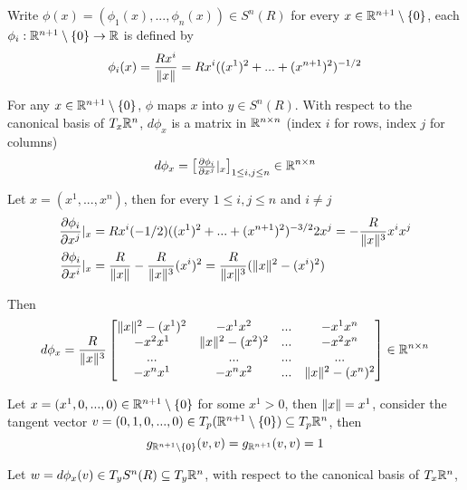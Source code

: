 Write $\phi(x) = (\phi_1(x), ..., \phi_n(x)) \in S^n(R)$ for every $x \in \mathbb{R}^{n+1} \setminus \{0\}$, each $\phi_i: \mathbb{R}^{n+1} \setminus \{0\} \to \mathbb{R}$ is defined by
$$
	\phi_i(x) = \frac{ R x^i}{\lVert x\rVert} = R x^i ((x^1)^2 + ... + (x^{n+1})^2)^{- 1/2}
$$

For any $x \in \mathbb{R}^{n+1} \setminus \{0\}$, $\phi$ maps $x$ into $y \in S^n(R)$. With respect to the canonical basis of $T_x \mathbb{R}^n$, $d\phi_x$ is a matrix in $\mathbb{R}^{n \times n}$ (index $i$ for rows, index $j$ for columns)
$$
	d \phi_x = \begin{bmatrix}
		\frac{\partial \phi_i}{\partial x^j} \vert_x
	\end{bmatrix}_{1 \leq i, j \leq n} \in \mathbb{R}^{n \times n}
$$

Let $x = (x^1, ..., x^n)$, then for every $1 \leq i, j \leq n$ and $i \neq j$
\begin{align*}
	\frac{\partial \phi_i}{\partial x^j} \vert_x &= R x^i (-1/2) ((x^1)^2 + ... + (x^{n+1})^2)^{- 3/2} 2x^j = - \frac{R}{\lVert x\rVert^3} x^i x^j \\
	\frac{\partial \phi_i}{\partial x^i} \vert_x &= \frac{R}{\lVert x\rVert} - \frac{R}{\lVert x\rVert^3} (x^i)^2 = \frac{R}{\lVert x\rVert^3} (\lVert x\rVert^2 - (x^i)^2)
\end{align*}

Then
$$
	d \phi_x = \frac{R}{\lVert x\rVert^3} \begin{bmatrix}
		\lVert x\rVert^2 - (x^1)^2 & -x^1 x^2 & ... & -x^1 x^n \\
		-x^2 x^1 & \lVert x\rVert^2 - (x^2)^2 & ... & -x^2 x^n \\
		... & ... & ... & ... \\
		-x^n x^1 & -x^n x^2 & ... & \lVert x\rVert^2 - (x^n)^2
	\end{bmatrix} \in \mathbb{R}^{n \times n}
$$

Let $x = (x^1, 0, ..., 0) \in \mathbb{R}^{n+1} \setminus \{0\}$ for some $x^1 > 0$, then $\lVert x\rVert = x^1$, consider the tangent vector $v = (0, 1, 0, ..., 0) \in T_p (\mathbb{R}^{n+1} \setminus \{0\}) \subseteq T_p \mathbb{R}^n$, then
$$
	g_{\mathbb{R}^{n+1} \setminus \{0\}} (v, v) = g_{\mathbb{R}^{n+1}} (v, v) = 1
$$

Let $w = d\phi_x (v) \in T_y S^n(R) \subseteq T_y \mathbb{R}^n$, with respect to the canonical basis of $T_x \mathbb{R}^n$,

